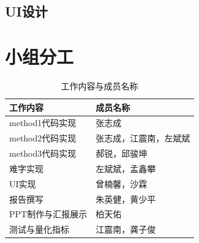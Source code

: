 \documentclass[12pt,hyperref,a4paper,UTF8]{ctexart}
\begin{document}
\subsection{UI设计}

\section{小组分工}
\begin{table}[H] %
    \centering
    \begin{tabular}{>{\centering\arraybackslash}p{} >{\centering\arraybackslash}p{}} %
        \toprule
        \textbf{工作内容} & \textbf{成员名称} \\ %
        \midrule
        method1代码实现 & 张志成 \\
        method2代码实现 & 张志成，江震南，左斌斌 \\
        method3代码实现 & 郝锐，邱骏坤 \\
        难字实现 & 左斌斌，孟鑫攀 \\
        UI实现 & 曾楠馨，沙霖 \\
        报告撰写 & 朱英健，黄少平 \\
        PPT制作与汇报展示 & 柏天佑 \\
        测试与量化指标 & 江震南，龚子俊 \\
        \bottomrule
    \end{tabular}
    \caption{工作内容与成员名称}
    \label{tab:work_distribution}
\end{table}


\end{document}
